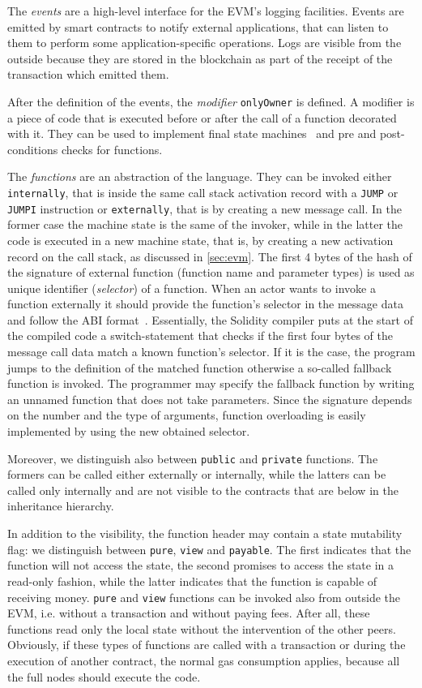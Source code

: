 The \emph{events} are a high-level interface for the EVM's logging facilities.
Events are emitted by smart contracts to notify external applications, that can
listen to them to perform some application-specific operations. Logs are visible
from the outside because they are stored in the blockchain as part of the
receipt of the transaction which emitted them.

After the definition of the events, the \emph{modifier} \verb|onlyOwner| is
defined. A modifier is a piece of code that is executed before or after the call
of a function decorated with it. They can be used to implement final state
machines~\cite{bib:solidity-docs} and pre and post-conditions checks for
functions.

The \emph{functions} are an abstraction of the language. They can be invoked
either \texttt{internally}, that is inside the same call stack activation record
with a \texttt{JUMP} or \texttt{JUMPI} instruction or \texttt{externally}, that
is by creating a new message call. In the former case the machine state is the
same of the invoker, while in the latter the code is executed in a new machine
state, that is, by creating a new activation record on the call stack, as
discussed in \autoref{sec:evm}. The first 4 bytes of the hash of the signature
of external function (function name and parameter types) is used as unique
identifier (\emph{selector}) of a function. When an actor wants to invoke a
function externally it should provide the function's selector in the message
data and follow the ABI format~\cite{bib:solidity-docs}. Essentially, the
Solidity compiler puts at the start of the compiled code a switch-statement that
checks if the first four bytes of the message call data match a known function's
selector. If it is the case, the program jumps to the definition of the matched
function otherwise a so-called fallback function is invoked. The programmer may
specify the fallback function by writing an unnamed function that does not take
parameters. Since the signature depends on the number and the type of arguments,
function overloading is easily implemented by using the new obtained selector.

Moreover, we distinguish also between \texttt{public} and \texttt{private}
functions. The formers can be called either externally or internally, while the
latters can be called only internally and are not visible to the contracts that
are below in the inheritance hierarchy.

In addition to the visibility, the function header may contain a state
mutability flag: we distinguish between \texttt{pure}, \texttt{view} and
\texttt{payable}. The first indicates that the function will not access the
state, the second promises to access the state in a read-only fashion, while the
latter indicates that the function is capable of receiving money. \texttt{pure}
and \texttt{view} functions can be invoked also from outside the EVM, i.e.
without a transaction and without paying fees. After all, these functions read
only the local state without the intervention of the other peers. Obviously, if
these types of functions are called with a transaction or during the execution
of another contract, the normal gas consumption applies, because all the full
nodes should execute the code.
